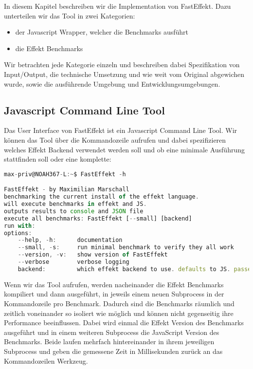 
In diesem Kapitel beschreiben wir die Implementation von FastEffekt.
Dazu unterteilen wir das Tool in zwei Kategorien:
\begin{itemize}
    \item der Javascript Wrapper, welcher die Benchmarks ausführt
    \item die Effekt Benchmarks
\end{itemize}     
Wir betrachten jede Kategorie einzeln und beschreiben dabei Spezifikation von Input/Output, die technische Umsetzung und wie weit vom Original abgewichen wurde, sowie die ausführende Umgebung und Entwicklungsumgebungen.

\subsection{Javascript Command Line Tool}
Das User Interface von FastEffekt ist ein Javascript Command Line Tool.
Wir können das Tool über die Kommandozeile aufrufen und dabei spezifizieren welches Effekt Backend verwendet werden soll und ob eine minimale Ausführung stattfinden soll oder eine komplette:
\begin{lstlisting}[language=JavaScript]
max-priv@NOAH367-L:~$ FastEffekt -h

FastEffekt - by Maximilian Marschall
benchmarking the current install of the effekt language.
will execute benchmarks in effekt and JS.
outputs results to console and JSON file
execute all benchmarks: FastEffekt [--small] [backend]
run with: 
options:
    --help, -h:      documentation
    --small, -s:     run minimal benchmark to verify they all work
    --version, -v:   show version of FastEffekt
    --verbose        verbose logging
    backend:         which effekt backend to use. defaults to JS. passed        directly to effekt.sh
\end{lstlisting}

Wenn wir das Tool aufrufen, werden nacheinander die Effekt Benchmarks kompiliert und dann ausgeführt, in jeweils einem neuen Subprocess in der Kommandozeile pro Benchmark. Dadurch sind die Benchmarks räumlich und zeitlich voneinander so isoliert wie möglich und können nicht gegenseitig ihre Performance beeinflussen.
Dabei wird einmal die Effekt Version des Benchmarks ausgeführt und in einem weiteren Subprocess die JavaScript Version des Benchmarks. Beide laufen mehrfach hintereinander in ihrem jeweiligen Subprocess und geben die gemessene Zeit in Millisekunden zurück an das Kommandozeilen Werkzeug.

